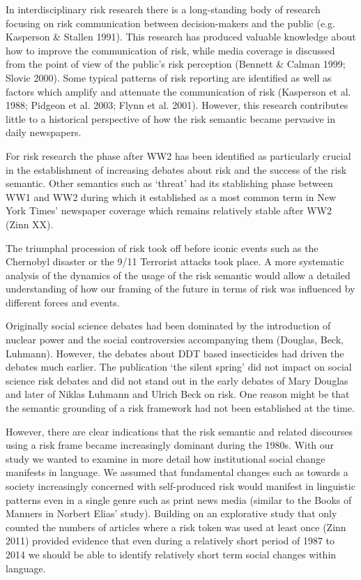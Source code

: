 In interdisciplinary risk research there is a long-standing body of research focusing on risk communication between decision-makers and the public (e.g. Kasperson \& Stallen 1991). This research has produced valuable knowledge about how to improve the communication of risk, while media coverage is discussed from the point of view of the public's risk perception (Bennett \& Calman 1999; Slovic 2000). Some typical patterns of risk reporting are identified as well as factors which amplify and attenuate the communication of risk (Kasperson et al. 1988; Pidgeon et al. 2003; Flynn et al. 2001). However, this research contributes little to a historical perspective of how the risk semantic became pervasive in daily newspapers. 

For risk research the phase after WW2 has been identified as particularly crucial in the establishment of increasing debates about risk and the success of the risk semantic. Other semantics such as `threat' had its stablishing phase between WW1 and WW2 during which it established as a most common term in New York Times' newspaper coverage which remains relatively stable after WW2 (Zinn XX).

The triumphal procession of risk took off before iconic events such as the Chernobyl disaster or the 9\slash 11 Terrorist attacks took place. A more systematic analysis of the dynamics of the usage of the risk semantic would allow a detailed understanding of how our framing of the future in terms of risk was influenced by different forces and events. 

Originally social science debates had been dominated by the introduction of nuclear power and the social controversies accompanying them (Douglas, Beck, Luhmann). However, the debates about DDT based insecticides had driven the debates much earlier. The publication `the silent spring' did not impact on social science risk debates and did not stand out in the early debates of Mary Douglas and later of Niklas Luhmann and Ulrich Beck on risk. One reason might be that the semantic grounding of a risk framework had not been established at the time. 

However, there are clear indications that the risk semantic and related discourses using a risk frame became increasingly dominant during the 1980s. With our study we wanted to examine in more detail how institutional social change manifests in language. We assumed that fundamental changes such as towards a society increasingly concerned with self-produced risk would manifest in linguistic patterns even in a single genre such as print news media (similar to the Books of Manners in Norbert Elias' study). Building on an explorative study that only counted the numbers of articles where a risk token was used at least once (Zinn 2011) provided evidence that even during a relatively short period of 1987 to 2014 we should be able to identify relatively short term social changes within language. 

